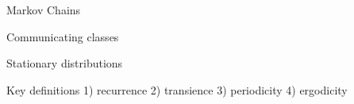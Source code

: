 \documentclass[main.tex]{subfiles}
\begin{document}
 
Markov Chains
 
Communicating classes
 
Stationary distributions
 
Key definitions
1) recurrence
2) transience
3) periodicity
4) ergodicity
\end{document}
